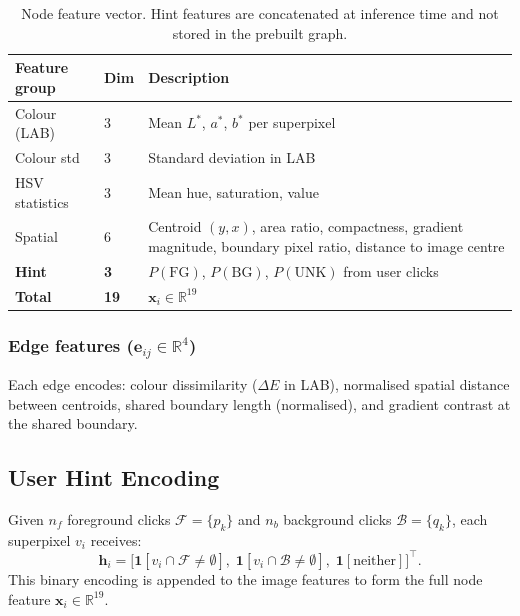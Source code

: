 \documentclass[11pt]{article}
\begin{document}
\begin{table}[h]
\centering
\small
\begin{tabular}{llp{7cm}}
\toprule
\textbf{Feature group} & \textbf{Dim} & \textbf{Description} \\
\midrule
Colour (LAB)   & 3  & Mean $L^*$, $a^*$, $b^*$ per superpixel \\
Colour std     & 3  & Standard deviation in LAB \\
HSV statistics & 3  & Mean hue, saturation, value \\
Spatial        & 6  & Centroid $(y,x)$, area ratio, compactness, gradient magnitude,
                       boundary pixel ratio, distance to image centre \\
\midrule
\textbf{Hint} & \textbf{3}  & $P(\text{FG})$, $P(\text{BG})$, $P(\text{UNK})$ from user clicks \\
\midrule
\textbf{Total} & \textbf{19} & $\mathbf{x}_i \in \mathbb{R}^{19}$ \\
\bottomrule
\end{tabular}
\caption{Node feature vector. Hint features are concatenated at inference time and
         not stored in the prebuilt graph.}
\label{tab:node-features}
\end{table}

\subsubsection*{Edge features ($\mathbf{e}_{ij} \in \mathbb{R}^{4}$)}

Each edge encodes: colour dissimilarity ($\Delta E$ in LAB), normalised spatial distance
between centroids, shared boundary length (normalised), and gradient contrast at the shared
boundary.

\subsection{User Hint Encoding}

Given $n_f$ foreground clicks $\mathcal{F} = \{p_k\}$ and $n_b$ background clicks
$\mathcal{B} = \{q_k\}$, each superpixel $v_i$ receives:
\begin{equation}
  \mathbf{h}_i =
  \bigl[\mathbf{1}[v_i \cap \mathcal{F} \neq \emptyset],\;
        \mathbf{1}[v_i \cap \mathcal{B} \neq \emptyset],\;
        \mathbf{1}[\text{neither}]\bigr]^\top.
\end{equation}
This binary encoding is appended to the image features to form the full node feature
$\mathbf{x}_i \in \mathbb{R}^{19}$.
\end{document}
